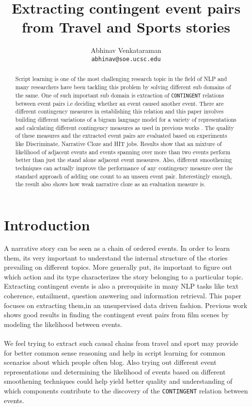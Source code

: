 \documentclass[12pt]{article}
\title{Extracting contingent event pairs from Travel and Sports stories}
\author{Abhinav Venkataraman  \\
  {\tt abhinav@soe.ucsc.edu} }
\date{}
\begin{document}
\maketitle
\begin{abstract}
	Script learning is one of the most challenging research topic in the field of NLP and many researchers have been tackling this problem by solving different sub domains of the same. One of such important sub domain is extraction of \texttt{CONTINGENT} relations between event pairs i.e deciding whether an event caused another event. There are different contingency measures in establishing this relation and this paper involves building different variations of a bigram language model for a variety of representations \cite{manshadi} and calculating different contingency measures as used in previous works \cite{film}. The quality of these measures and the extracted event pairs are evaluated based on experiments like Discriminate, Narrative Cloze and HIT jobs. Results show that an mixture of likelihood of adjacent events and events spanning over more than two events perform better than just the stand alone adjacent event measures. Also, different smoothening techniques can actually improve the performance of any contingency measure over the standard approach of adding one count to an unseen event pair. Interestingly enough, the result also shows how weak narrative cloze as an evaluation measure is.
\end{abstract}


\section{Introduction}

A narrative story can be seen as a chain of ordered events. In order to learn them, its very important to understand the internal structure of the stories prevailing on different topics. More generally put, its important to figure out which action and its type characterizes the story belonging to a particular topic. Extracting contingent events is also a  prerequisite in many NLP tasks like text coherence, entailment, question answering and information retrieval\cite{cp}. This paper focuses on extracting them,in an unsupervised data driven fashion. Previous work shows good results in finding the contingent event pairs from film scenes by modeling the likelihood between events\cite{film}. \\
\smallskip \\
We feel trying to extract such causal chains from travel and sport may provide for better common sense reasoning and help in script learning for common scenarios about which people often blog. Also  trying out different event representations and determining the likelihood of events based on different smoothening techniques could help yield better quality and understanding of which components contribute to the discovery of the \texttt{CONTINGENT} relation between events. \\
\smallskip \\
\end{document}
